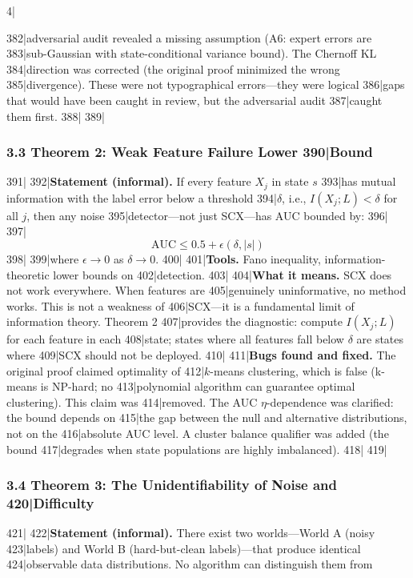 4|\documentclass[
5|  12pt,
6|]{article}
\begin{document}
382|adversarial audit revealed a missing assumption (A6: expert errors are
383|sub-Gaussian with state-conditional variance bound). The Chernoff KL
384|direction was corrected (the original proof minimized the wrong
385|divergence). These were not typographical errors---they were logical
386|gaps that would have been caught in review, but the adversarial audit
387|caught them first.
388|
389|\subsubsection{3.3 Theorem 2: Weak Feature Failure Lower
390|Bound}\label{theorem-2-weak-feature-failure-lower-bound}
391|
392|\textbf{Statement (informal).} If every feature \(X_j\) in state \(s\)
393|has mutual information with the label error below a threshold
394|\(\delta\), i.e., \(I(X_j; L) < \delta\) for all \(j\), then any noise
395|detector---not just SCX---has AUC bounded by:
396|
397|\[{\text{AUC}} \leq 0.5 + \epsilon(\delta, |s|)\]
398|
399|where \(\epsilon \to 0\) as \(\delta \to 0\).
400|
401|\textbf{Tools.} Fano inequality, information-theoretic lower bounds on
402|detection.
403|
404|\textbf{What it means.} SCX does not work everywhere. When features are
405|genuinely uninformative, no method works. This is not a weakness of
406|SCX---it is a fundamental limit of information theory. Theorem 2
407|provides the diagnostic: compute \(I(X_j; L)\) for each feature in each
408|state; states where all features fall below \(\delta\) are states where
409|SCX should not be deployed.
410|
411|\textbf{Bugs found and fixed.} The original proof claimed optimality of
412|\(k\)-means clustering, which is false (k-means is NP-hard; no
413|polynomial algorithm can guarantee optimal clustering). This claim was
414|removed. The AUC \(\eta\)-dependence was clarified: the bound depends on
415|the gap between the null and alternative distributions, not on the
416|absolute AUC level. A cluster balance qualifier was added (the bound
417|degrades when state populations are highly imbalanced).
418|
419|\subsubsection{3.4 Theorem 3: The Unidentifiability of Noise and
420|Difficulty}\label{theorem-3-the-unidentifiability-of-noise-and-difficulty}
421|
422|\textbf{Statement (informal).} There exist two worlds---World A (noisy
423|labels) and World B (hard-but-clean labels)---that produce identical
424|observable data distributions. No algorithm can distinguish them from
\end{document}
